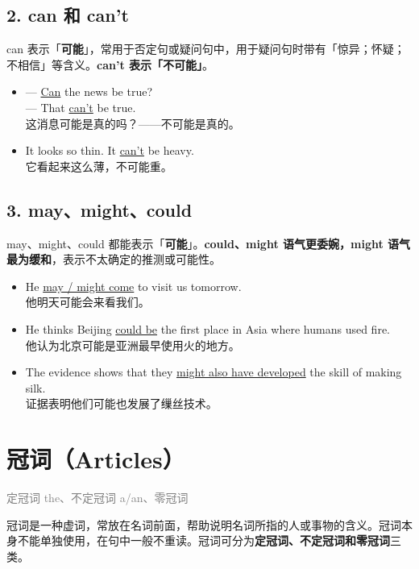 \documentclass[11pt,a4paper]{ctexart}
\begin{document}
\subsection*{2. can 和 can’t}

can 表示「\textbf{可能}」，常用于否定句或疑问句中，用于疑问句时带有「惊异；怀疑；不相信」等含义。\textbf{can’t 表示「不可能」}。

\begin{itemize}[leftmargin=1.4em]
\item — \underline{Can} the news be true?\\ — That \underline{can’t} be true.\\ 这消息可能是真的吗？——不可能是真的。
\item It looks so thin. It \underline{can’t} be heavy.\\ 它看起来这么薄，不可能重。
\end{itemize}

\subsection*{3. may、might、could}

may、might、could 都能表示「\textbf{可能}」。\textbf{could、might 语气更委婉，might 语气最为缓和}，表示不太确定的推测或可能性。

\begin{itemize}[leftmargin=1.4em]
\item He \underline{may / might come} to visit us tomorrow.\\ 他明天可能会来看我们。
\item He thinks Beijing \underline{could be} the first place in Asia where humans used fire.\\ 他认为北京可能是亚洲最早使用火的地方。
\item The evidence shows that they \underline{might also have developed} the skill of making silk.\\ 证据表明他们可能也发展了缫丝技术。
\end{itemize}

\begin{center}\end{center}

\section{冠词（Articles）}
\noindent\textcolor{gray}{定冠词 the、不定冠词 a/an、零冠词}\par\smallskip
冠词是一种虚词，常放在名词前面，帮助说明名词所指的人或事物的含义。冠词本身不能单独使用，在句中一般不重读。冠词可分为\textbf{定冠词、不定冠词和零冠词}三类。
\end{document}

